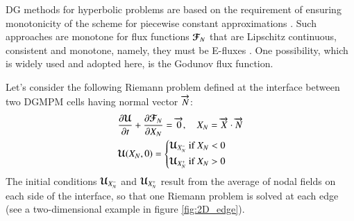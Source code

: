 DG methods for hyperbolic problems are based on the requirement of ensuring monotonicity of the scheme for piecewise constant approximations \cite{Cockburn}. 
Such approaches are monotone for flux functions ${\boldsymbol{\mathcal{F}}}_N$ that are Lipschitz continuous, consistent and monotone, namely, they must be E-fluxes \cite{Osher}.
One possibility, which is widely used and adopted here, is the Godunov flux function. 

Let's consider the following Riemann problem defined at the interface between two DGMPM cells having normal vector ${\overrightarrow{N}}$:
\begin{equation}
  \label{eq:RP_mesh}
  \begin{aligned}
    &\frac{\partial {\boldsymbol{\mathcal{U}}}}{\partial t} + \frac{\partial {\boldsymbol{\mathcal{F}}}_N}{\partial X_N} = {\overrightarrow{0}}, \quad X_N={\overrightarrow{X}}\cdot{\overrightarrow{N}}  \\
    & {\boldsymbol{\mathcal{U}}}(X_N,0)= \left\lbrace 
      \begin{aligned}
        & {\boldsymbol{\mathcal{U}}}_{X_N^-} \text{ if } X_N < 0 \\
        & {\boldsymbol{\mathcal{U}}}_{X_N^{+}} \text{ if } X_N > 0
      \end{aligned}
        \right.
  \end{aligned}
\end{equation}
The initial conditions ${\boldsymbol{\mathcal{U}}}_{X_N^-}$ and ${\boldsymbol{\mathcal{U}}}_{X_N^{+}}$ result from the average of nodal fields on each side of the interface, so that one Riemann problem is solved at each edge (see a two-dimensional example in figure \ref{fig:2D_edge}).

